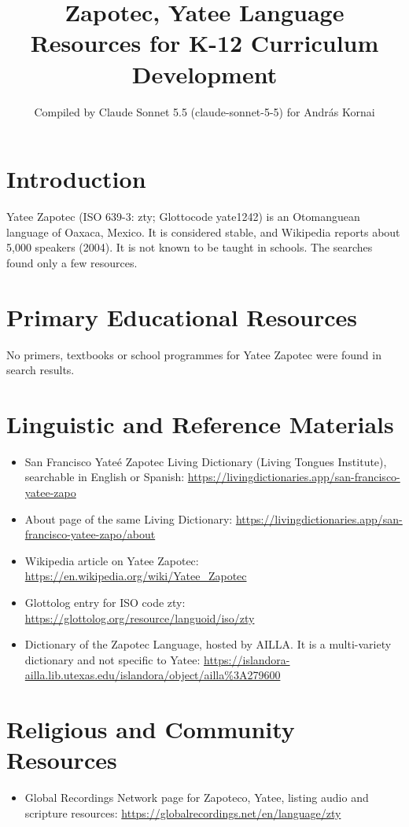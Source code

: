 \documentclass[12pt]{article}
\title{Zapotec, Yatee Language Resources for K-12 Curriculum Development}
\author{Compiled by Claude Sonnet 5.5 (claude-sonnet-5-5) for Andr\'as Kornai}
\date{}
\begin{document}
\maketitle

\section{Introduction}
Yatee Zapotec (ISO 639-3: zty; Glottocode yate1242) is an Otomanguean language of Oaxaca, Mexico. It is considered stable, and Wikipedia reports about 5,000 speakers (2004). It is not known to be taught in schools. The searches found only a few resources.

\section{Primary Educational Resources}
No primers, textbooks or school programmes for Yatee Zapotec were found in search results.

\section{Linguistic and Reference Materials}
\begin{itemize}
\item San Francisco Yate\'e Zapotec Living Dictionary (Living Tongues Institute), searchable in English or Spanish: \url{https://livingdictionaries.app/san-francisco-yatee-zapo}
\item About page of the same Living Dictionary: \url{https://livingdictionaries.app/san-francisco-yatee-zapo/about}
\item Wikipedia article on Yatee Zapotec: \url{https://en.wikipedia.org/wiki/Yatee_Zapotec}
\item Glottolog entry for ISO code zty: \url{https://glottolog.org/resource/languoid/iso/zty}
\item Dictionary of the Zapotec Language, hosted by AILLA. It is a multi-variety dictionary and not specific to Yatee: \url{https://islandora-ailla.lib.utexas.edu/islandora/object/ailla%3A279600}
\end{itemize}

\section{Religious and Community Resources}
\begin{itemize}
\item Global Recordings Network page for Zapoteco, Yatee, listing audio and scripture resources: \url{https://globalrecordings.net/en/language/zty}
\end{itemize}
\end{document}
